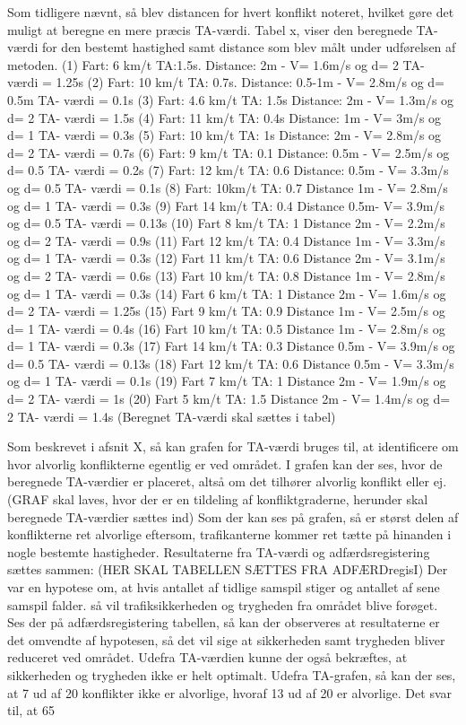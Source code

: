 Som tidligere nævnt, så blev distancen for hvert konflikt noteret, hvilket gøre det muligt at beregne en mere præcis TA-værdi. Tabel x, viser den beregnede TA-værdi for den bestemt hastighed samt distance som blev målt under udførelsen af metoden.
(1) Fart: 6 km/t TA:1.5s. Distance: 2m - V= 1.6m/s og d= 2 TA- værdi = 1.25s
(2) Fart: 10 km/t TA: 0.7s. Distance: 0.5-1m - V= 2.8m/s og d= 0.5m TA- værdi = 0.1s
(3) Fart: 4.6 km/t TA: 1.5s Distance: 2m - V= 1.3m/s og d= 2 TA- værdi = 1.5s
(4) Fart: 11 km/t TA: 0.4s Distance: 1m - V= 3m/s og d= 1 TA- værdi = 0.3s
(5) Fart: 10 km/t TA: 1s Distance: 2m - V= 2.8m/s og d= 2 TA- værdi = 0.7s
(6) Fart: 9 km/t TA: 0.1 Distance: 0.5m - V= 2.5m/s og d= 0.5 TA- værdi = 0.2s
(7) Fart: 12 km/t TA: 0.6 Distance: 0.5m - V= 3.3m/s og d= 0.5 TA- værdi = 0.1s
(8) Fart: 10km/t TA: 0.7 Distance 1m - V= 2.8m/s og d= 1 TA- værdi = 0.3s
(9) Fart 14 km/t TA: 0.4 Distance 0.5m- V= 3.9m/s og d= 0.5 TA- værdi = 0.13s
(10) Fart 8 km/t TA: 1 Distance 2m - V= 2.2m/s og d= 2 TA- værdi = 0.9s
(11) Fart 12 km/t TA: 0.4 Distance 1m - V= 3.3m/s og d= 1 TA- værdi = 0.3s
(12) Fart 11 km/t TA: 0.6 Distance 2m - V= 3.1m/s og d= 2 TA- værdi = 0.6s
(13) Fart 10 km/t TA: 0.8 Distance 1m - V= 2.8m/s og d= 1 TA- værdi = 0.3s
(14) Fart 6 km/t TA: 1 Distance 2m - V= 1.6m/s og d= 2 TA- værdi = 1.25s
(15) Fart 9 km/t TA: 0.9 Distance 1m - V= 2.5m/s og d= 1 TA- værdi = 0.4s
(16) Fart 10 km/t TA: 0.5 Distance 1m - V= 2.8m/s og d= 1 TA- værdi = 0.3s
(17) Fart 14 km/t TA: 0.3 Distance 0.5m - V= 3.9m/s og d= 0.5 TA- værdi = 0.13s
(18) Fart 12 km/t TA: 0.6 Distance 0.5m - V= 3.3m/s og d= 1 TA- værdi = 0.1s
(19) Fart 7 km/t TA: 1 Distance 2m - V= 1.9m/s og d= 2 TA- værdi = 1s
(20) Fart 5 km/t TA: 1.5 Distance 2m - V= 1.4m/s og d= 2 TA- værdi = 1.4s
(Beregnet TA-værdi skal sættes i tabel)

Som beskrevet i afsnit X, så kan grafen for TA-værdi bruges til, at identificere om hvor alvorlig konflikterne egentlig er ved området. I grafen kan der ses, hvor de beregnede TA-værdier er placeret, altså om det tilhører alvorlig konflikt eller ej.
(GRAF skal laves, hvor der er en tildeling af konfliktgraderne, herunder skal beregnede TA-værdier sættes ind)
Som der kan ses på grafen, så er størst delen af konflikterne ret alvorlige eftersom, trafikanterne kommer ret tætte på hinanden i nogle bestemte hastigheder.
Resultaterne fra TA-værdi og adfærdsregistering sættes sammen: (HER SKAL TABELLEN SÆTTES FRA ADFÆRDregisI)
Der var en hypotese om, at hvis antallet af tidlige samspil stiger og antallet af sene samspil falder. så vil trafiksikkerheden og trygheden fra området blive forøget. Ses der på adfærdsregistering tabellen, så kan der observeres at resultaterne er det omvendte af hypotesen, så det vil sige at sikkerheden samt trygheden bliver reduceret ved området. Udefra TA-værdien kunne der også bekræftes, at sikkerheden og trygheden ikke er helt optimalt.
Udefra TA-grafen, så kan der ses, at 7 ud af 20 konflikter ikke er alvorlige, hvoraf 13 ud af 20 er alvorlige. Det svar til, at 65%
